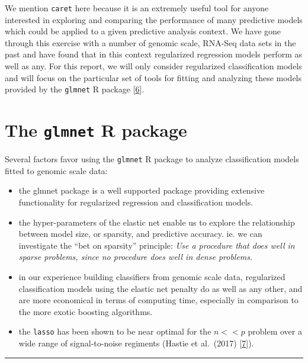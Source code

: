 \documentclass[
]{book}
\begin{document}
We mention \texttt{caret} here because it is an extremely useful tool for
anyone interested in exploring and comparing the performance of
many predictive models which could be applied to a given predictive
analysis context. We have gone through this exercise with a number
of genomic scale, RNA-Seq data sets in the past and have found
that in this context regularized regression models perform
as well as any. For this report, we will only consider regularized classification
models and will focus on the particular set of tools for fitting and analyzing
these models provided by the \texttt{glmnet} R package {[}\protect\hyperlink{ref-Friedman:2010aa}{6}{]}.

\hypertarget{the-glmnet-r-package}{%
\section{\texorpdfstring{The \texttt{glmnet} R package}{The glmnet R package}}\label{the-glmnet-r-package}}

Several factors favor using the \texttt{glmnet} R package to analyze
classification models fitted to genomic scale data:

\begin{itemize}
\item
  the glmnet package is a well supported package providing
  extensive functionality for regularized regression and classification models.
\item
  the hyper-parameters of the elastic net enable us to explore
  the relationship between model size, or sparsity, and predictive accuracy.
  ie. we can investigate the ``bet on sparsity'' principle:
  \emph{Use a procedure that does well in sparse problems, since no procedure
  does well in dense problems}.
\item
  in our experience building classifiers from genomic scale data, regularized
  classification models using the elastic net penalty do as well as any other,
  and are more economical in terms of computing time, especially in comparison to
  the more exotic boosting algorithms.
\item
  the \texttt{lasso} has been shown to be near optimal for the \(n<<p\) problem
  over a wide range of signal-to-noise regiments (Hastie et al.~(2017) {[}\protect\hyperlink{ref-Hastie:2017aa}{7}{]}).
\end{itemize}

\begin{center}\rule{0.5\linewidth}{0.5pt}\end{center}
\end{document}
